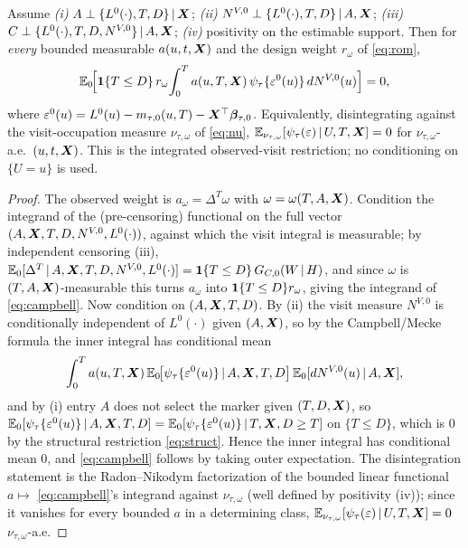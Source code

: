 \begin{lemma}\label{lem:transport}
Assume \emph{(i)} $A\perp\{L^0(\cdot),T,D\}\,\vert\,\bm{X}$; \emph{(ii)}
$N^{V,0}\perp\{L^0(\cdot),T,D\}\,\vert\, A,\bm{X}$; \emph{(iii)}
$C\perp\{L^0(\cdot),T,D,N^{V,0}\}\,\vert\, A,\bm{X}$; \emph{(iv)} positivity on the
estimable support. Then for \emph{every} bounded measurable $a(u,t,\bm{X})$ and the
design weight $r_\omega$ of \eqref{eq:rom},
\begin{equation}
\mathbb{E}_0\!\Big[\mathbf{1}\{T\le D\}\,r_\omega\!\int_0^{T}a(u,T,\bm{X})\,
   \psi_\tau\{\varepsilon^0(u)\}\,dN^{V,0}(u)\Big]=0,
\label{eq:campbell}
\end{equation}
where $\varepsilon^0(u)=L^0(u)-m_{\tau,0}(u,T)-\bm{X}^\top\bm{\beta}_{\tau,0}$.
Equivalently, disintegrating against the visit-occupation measure
$\nu_{\tau,\omega}$ of \eqref{eq:nu}, $\mathbb{E}_{\nu_{\tau,\omega}}[\psi_\tau(\varepsilon)
\,\vert\, U,T,\bm{X}]=0$ for $\nu_{\tau,\omega}$-a.e.\ $(u,t,\bm{X})$. This is the
integrated observed-visit restriction; no conditioning on $\{U=u\}$ is used.
\end{lemma}
\begin{proof}
The observed weight is $a_\omega=\Delta^T\omega$ with $\omega=\omega(T,A,\bm{X})$.
Condition the integrand of the (pre-censoring) functional on the full vector
$(A,\bm{X},T,D,N^{V,0},L^0(\cdot))$, against which the visit integral is measurable;
by independent censoring (iii), $\mathbb{E}_0[\Delta^T\,\vert\, A,\bm{X},T,D,N^{V,0},L^0(\cdot)]
=\mathbf{1}\{T\le D\}\,G_{C,0}(W\,\vert\, H)$, and since $\omega$ is $(T,A,\bm{X})$-measurable
this turns $a_\omega$ into $\mathbf{1}\{T\le D\}r_\omega$, giving the integrand of
\eqref{eq:campbell}. Now condition on $(A,\bm{X},T,D)$. By (ii) the visit measure
$N^{V,0}$ is conditionally independent of $L^0(\cdot)$ given $(A,\bm{X})$, so by the
Campbell/Mecke formula the inner integral has conditional mean
\[
\int_0^{T}a(u,T,\bm{X})\,\mathbb{E}_0\!\big[\psi_\tau\{\varepsilon^0(u)\}\,\vert\,
   A,\bm{X},T,D\big]\,\mathbb{E}_0[dN^{V,0}(u)\,\vert\, A,\bm{X}],
\]
and by (i) entry $A$ does not select the marker given $(T,D,\bm{X})$, so
$\mathbb{E}_0[\psi_\tau\{\varepsilon^0(u)\}\,\vert\, A,\bm{X},T,D]
=\mathbb{E}_0[\psi_\tau\{\varepsilon^0(u)\}\,\vert\, T,\bm{X},D\ge T]$ on $\{T\le D\}$, which is
$0$ by the structural restriction \eqref{eq:struct}. Hence the inner integral has
conditional mean $0$, and \eqref{eq:campbell} follows by taking outer expectation.
The disintegration statement is the Radon--Nikodym factorization of the bounded
linear functional $a\mapsto$ \eqref{eq:campbell}'s integrand against
$\nu_{\tau,\omega}$ (well defined by positivity (iv)); since it vanishes for every
bounded $a$ in a determining class, $\mathbb{E}_{\nu_{\tau,\omega}}[\psi_\tau(\varepsilon)
\,\vert\, U,T,\bm{X}]=0$ $\nu_{\tau,\omega}$-a.e.
\end{proof}

